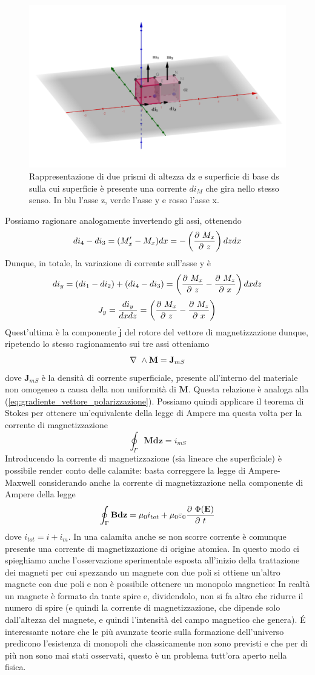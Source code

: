 \documentclass[
10pt, %
a4paper, %
oneside, %
headinclude,footinclude, %
BCOR5mm, %
]{scrartcl}
\begin{document}
\begin{figure}[h!]
	\centering
	\includegraphics[width=0.7\linewidth]{../images/prismi_1}
	\caption{Rappresentazione di due prismi di altezza dz e superficie di base ds sulla cui superficie è presente una corrente \(di_M\) che gira nello stesso senso. In blu l'asse z, verde l'asse y e rosso l'asse x.}
	\label{fig:prismi1}
\end{figure}
\FloatBarrier
Possiamo ragionare analogamente invertendo gli assi, ottenendo
\[di_4 - di_3 = (M'_x - M_x)dx = -\left(\frac{\partial\  M_x}{\partial\  z}\right)dz dx\]
Dunque, in totale, la variazione di corrente sull'asse y è
\[di_y = (di_1 -di_2)+(di_4-di_3)=\left(\frac{\partial\  M_x}{\partial\  z}-\frac{\partial\  M_z}{\partial\  x}\right)dxdz\]
\[J_y = \frac{di_y}{dxdz} = \left(\frac{\partial\  M_x}{\partial\  z}-\frac{\partial\  M_z}{\partial\  x}\right) \]
Quest'ultima è la componente \(\mathbf{\hat{j}}\) del rotore del vettore di magnetizzazione dunque, ripetendo lo stesso ragionamento sui tre assi otteniamo
\[\nabla\ \wedge\mathbf{M} = \mathbf{J}_{mS}\]
dove \(\mathbf{J}_{mS}\) è la densità di corrente superficiale, presente all'interno del materiale non omogeneo a causa della non uniformità di \(\mathbf{M}\). Questa relazione è analoga alla (\ref{eq:gradiente_vettore_polarizzazione}). Possiamo quindi applicare il teorema di Stokes per ottenere un'equivalente della legge di Ampere ma questa volta per la corrente di magnetizzazione
\[\oint_\Gamma\mathbf{M}\mathbf{dz} = i_{mS}\]
Introducendo la corrente di magnetizzazione (sia lineare che superficiale) è possibile render conto delle calamite: basta correggere la legge di Ampere-Maxwell considerando anche la corrente di magnetizzazione nella componente di Ampere della legge
\[\oint_\Gamma \mathbf{B}\mathbf{dz} = \mu_0 i_{tot} + \mu_0\varepsilon_0\frac{\partial\ \Phi(\mathbf{E})}{\partial\  t}\]
dove \(i_{tot} = i+i_m\). In una calamita anche se non scorre corrente è comunque presente una corrente di magnetizzazione di origine atomica. In questo modo ci spieghiamo anche l'osservazione sperimentale esposta all'inizio della trattazione dei magneti per cui spezzando un magnete con due poli si ottiene un'altro magnete con due poli e non è possibile ottenere un monopolo magnetico: In realtà un magnete è formato da tante spire e, dividendolo, non si fa altro che ridurre il numero di spire (e quindi la corrente di magnetizzazione, che dipende solo dall'altezza del magnete, e quindi l'intensità del campo magnetico che genera). \'{E} interessante notare che le più avanzate teorie sulla formazione dell'universo predicono l'esistenza di monopoli che classicamente non sono previsti e che per di più non sono mai stati osservati, questo è un problema tutt'ora aperto nella fisica.\\
\end{document}
